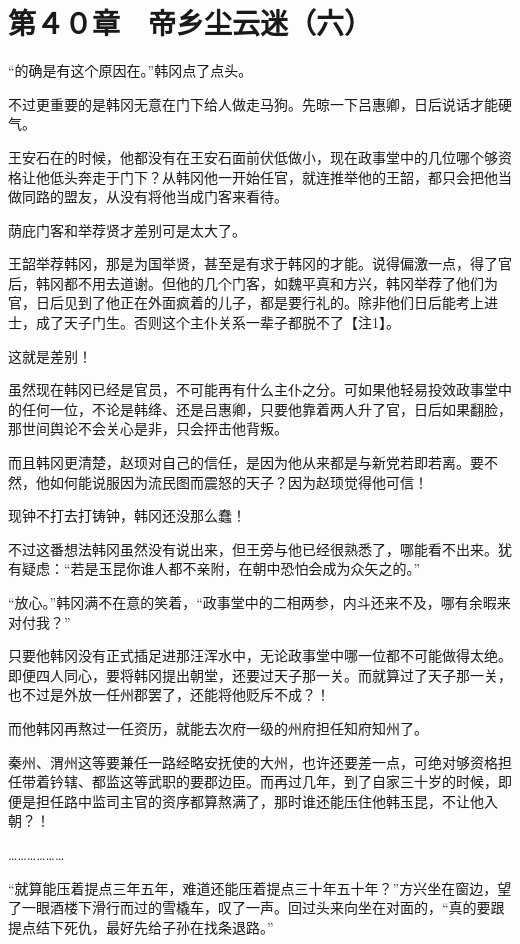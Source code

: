 \section{第４０章　帝乡尘云迷（六）}

“的确是有这个原因在。”韩冈点了点头。

不过更重要的是韩冈无意在门下给人做走马狗。先晾一下吕惠卿，日后说话才能硬气。

王安石在的时候，他都没有在王安石面前伏低做小，现在政事堂中的几位哪个够资格让他低头奔走于门下？从韩冈他一开始任官，就连推举他的王韶，都只会把他当做同路的盟友，从没有将他当成门客来看待。

荫庇门客和举荐贤才差别可是太大了。

王韶举荐韩冈，那是为国举贤，甚至是有求于韩冈的才能。说得偏激一点，得了官后，韩冈都不用去道谢。但他的几个门客，如魏平真和方兴，韩冈举荐了他们为官，日后见到了他正在外面疯着的儿子，都是要行礼的。除非他们日后能考上进士，成了天子门生。否则这个主仆关系一辈子都脱不了【注1】。

这就是差别！

虽然现在韩冈已经是官员，不可能再有什么主仆之分。可如果他轻易投效政事堂中的任何一位，不论是韩绛、还是吕惠卿，只要他靠着两人升了官，日后如果翻脸，那世间舆论不会关心是非，只会抨击他背叛。

而且韩冈更清楚，赵顼对自己的信任，是因为他从来都是与新党若即若离。要不然，他如何能说服因为流民图而震怒的天子？因为赵顼觉得他可信！

现钟不打去打铸钟，韩冈还没那么蠢！

不过这番想法韩冈虽然没有说出来，但王旁与他已经很熟悉了，哪能看不出来。犹有疑虑：“若是玉昆你谁人都不亲附，在朝中恐怕会成为众矢之的。”

“放心。”韩冈满不在意的笑着，“政事堂中的二相两参，内斗还来不及，哪有余暇来对付我？”

只要他韩冈没有正式插足进那汪浑水中，无论政事堂中哪一位都不可能做得太绝。即便四人同心，要将韩冈提出朝堂，还要过天子那一关。而就算过了天子那一关，也不过是外放一任州郡罢了，还能将他贬斥不成？！

而他韩冈再熬过一任资历，就能去次府一级的州府担任知府知州了。

秦州、渭州这等要兼任一路经略安抚使的大州，也许还要差一点，可绝对够资格担任带着钤辖、都监这等武职的要郡边臣。而再过几年，到了自家三十岁的时候，即便是担任路中监司主官的资序都算熬满了，那时谁还能压住他韩玉昆，不让他入朝？！

………………

“就算能压着提点三年五年，难道还能压着提点三十年五十年？”方兴坐在窗边，望了一眼酒楼下滑行而过的雪橇车，叹了一声。回过头来向坐在对面的，“真的要跟提点结下死仇，最好先给子孙在找条退路。”

